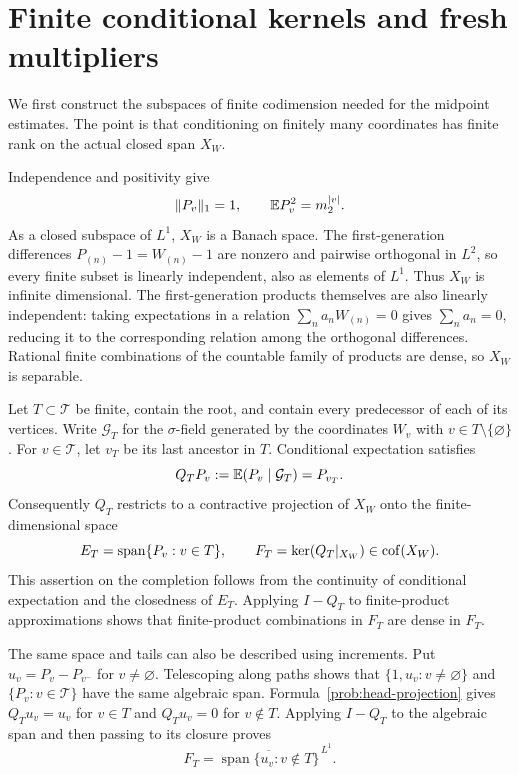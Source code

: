 \section{Finite conditional kernels and fresh multipliers}\label{sec:conditional}
We first construct the subspaces of finite codimension needed for the
midpoint estimates. The point is that conditioning on finitely many
coordinates has finite rank on the actual closed span $X_W$.

Independence and positivity give
\begin{equation}\label{prob:product-moments}
 \lVert P_v\rVert_1=1,\qquad \mathbb E P_v^2=m_2^{|v|}.
\end{equation}
As a closed subspace of $L^1$, $X_W$ is a Banach space. The first-generation differences
$P_{(n)}-1=W_{(n)}-1$ are nonzero and pairwise orthogonal in $L^2$, so every
finite subset is linearly independent, also as elements of $L^1$.
Thus $X_W$ is infinite dimensional.
The first-generation products themselves are also linearly independent:
taking expectations in a relation $\sum_n a_nW_{(n)}=0$ gives
$\sum_n a_n=0$, reducing it to the corresponding relation among the
orthogonal differences. Rational finite combinations of the countable
family of products are dense, so $X_W$ is separable.

Let $T\subset\mathcal T$ be finite, contain the root, and contain every
predecessor of each of its vertices.  Write $\mathcal G_T$ for the
$\sigma$-field generated by the coordinates $W_v$ with
$v\in T\setminus\{\varnothing\}$.  For $v\in\mathcal T$, let $v_T$ be its
last ancestor in $T$.  Conditional expectation satisfies
\begin{equation}\label{prob:head-projection}
 Q_TP_v:=\mathbb E(P_v\mid\mathcal G_T)=P_{v_T}.
\end{equation}
Consequently $Q_T$ restricts to a contractive projection of $X_W$ onto the
finite-dimensional space
\[
 E_T=\operatorname{span}\{P_v:v\in T\},
 \qquad F_T=\ker(Q_T|_{X_W})\in\operatorname{cof}(X_W).
\]
This assertion on the completion follows from the continuity of conditional
expectation and the closedness of $E_T$.  Applying $I-Q_T$ to finite-product
approximations shows that finite-product combinations in $F_T$ are dense in
$F_T$.

The same space and tails can also be described using increments. Put
$u_v=P_v-P_{v^-}$ for $v\ne\varnothing$.  Telescoping along paths shows that
$\{1,u_v:v\ne\varnothing\}$ and $\{P_v:v\in\mathcal T\}$ have the same
algebraic span.  Formula~\eqref{prob:head-projection} gives $Q_Tu_v=u_v$
for $v\in T$ and $Q_Tu_v=0$ for $v\notin T$.  Applying $I-Q_T$ to the
algebraic span and then passing to its closure proves
\begin{equation}\label{prob:jump-tail}
 F_T=\overline{\operatorname{span}\{u_v:v\notin T\}}^{\,L^1}.
\end{equation}

